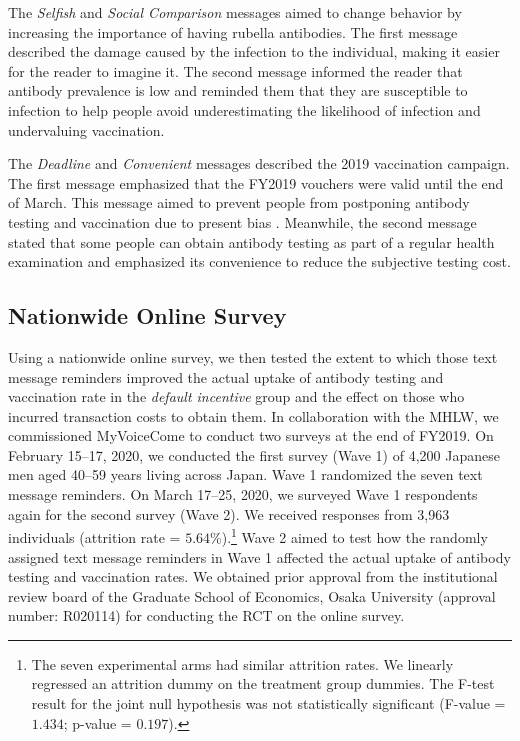 \documentclass[
  11pt,
  a4paper
]{article}
\begin{document}
The \emph{Selfish} and \emph{Social Comparison} messages aimed to change behavior by increasing the importance of having rubella antibodies. The first message described the damage caused by the infection to the individual, making it easier for the reader to imagine it. The second message informed the reader that antibody prevalence is low and reminded them that they are susceptible to infection to help people avoid underestimating the likelihood of infection and undervaluing vaccination.

The \emph{Deadline} and \emph{Convenient} messages described the 2019 vaccination campaign. The first message emphasized that the FY2019 vouchers were valid until the end of March. This message aimed to prevent people from postponing antibody testing and vaccination due to present bias \citep{ODonoghue2001}. Meanwhile, the second message stated that some people can obtain antibody testing as part of a regular health examination and emphasized its convenience to reduce the subjective testing cost.

\hypertarget{survey}{%
\subsection{Nationwide Online Survey}\label{survey}}

Using a nationwide online survey, we then tested the extent to which those text message reminders improved the actual uptake of antibody testing and vaccination rate in the \emph{default incentive} group and the effect on those who incurred transaction costs to obtain them. In collaboration with the MHLW, we commissioned MyVoiceCome to conduct two surveys at the end of FY2019. On February 15--17, 2020, we conducted the first survey (Wave 1) of 4,200 Japanese men aged 40--59 years living across Japan. Wave 1 randomized the seven text message reminders. On March 17--25, 2020, we surveyed Wave 1 respondents again for the second survey (Wave 2). We received responses from 3,963 individuals (attrition rate = \(5.64\)\%).\footnote{The seven experimental arms had similar attrition rates. We linearly regressed an attrition dummy on the treatment group dummies. The F-test result for the joint null hypothesis was not statistically significant (F-value = \(1.434\); p-value = \(0.197\)).} Wave 2 aimed to test how the randomly assigned text message reminders in Wave 1 affected the actual uptake of antibody testing and vaccination rates. We obtained prior approval from the institutional review board of the Graduate School of Economics, Osaka University (approval number: R020114) for conducting the RCT on the online survey.
\end{document}
